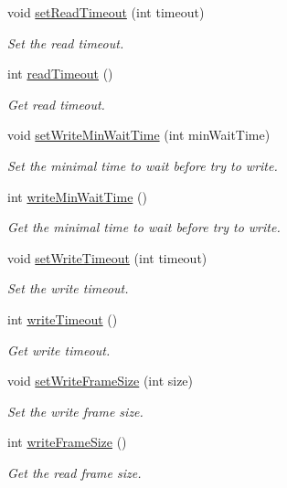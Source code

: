\begin{DoxyCompactItemize}
void \hyperlink{classmdt_port_config_a1028f6c9d7073a6591fa59fc907f0585}{setReadTimeout} (int timeout)
\begin{DoxyCompactList}\small\item\em Set the read timeout. \end{DoxyCompactList}\item 
int \hyperlink{classmdt_port_config_a51b06a66765d072f1d07251351477957}{readTimeout} ()
\begin{DoxyCompactList}\small\item\em Get read timeout. \end{DoxyCompactList}\item 
void \hyperlink{classmdt_port_config_a1d7515af56919b95f060cad4f83c6ef3}{setWriteMinWaitTime} (int minWaitTime)
\begin{DoxyCompactList}\small\item\em Set the minimal time to wait before try to write. \end{DoxyCompactList}\item 
int \hyperlink{classmdt_port_config_a448f69f4c78c51a8d52ff39c31ceb1d5}{writeMinWaitTime} ()
\begin{DoxyCompactList}\small\item\em Get the minimal time to wait before try to write. \end{DoxyCompactList}\item 
void \hyperlink{classmdt_port_config_ac117f7cd1f23de163a7fe84f69c2164c}{setWriteTimeout} (int timeout)
\begin{DoxyCompactList}\small\item\em Set the write timeout. \end{DoxyCompactList}\item 
int \hyperlink{classmdt_port_config_ab0c39fdce3e564f7308d869f4e28cb1c}{writeTimeout} ()
\begin{DoxyCompactList}\small\item\em Get write timeout. \end{DoxyCompactList}\item 
void \hyperlink{classmdt_port_config_a9539cef9e33d564c7c70902a6380be04}{setWriteFrameSize} (int size)
\begin{DoxyCompactList}\small\item\em Set the write frame size. \end{DoxyCompactList}\item 
int \hyperlink{classmdt_port_config_a4ea423e825c0730ede17a55fb723c6ac}{writeFrameSize} ()
\begin{DoxyCompactList}\small\item\em Get the read frame size. \end{DoxyCompactList}\item 

\end{DoxyCompactItemize}
